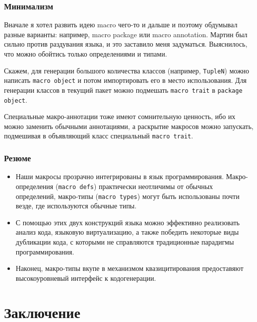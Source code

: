 \documentclass{beamer}
\begin{document}
\begin{frame}[t]
\frametitle{Минимализм}

Вначале я хотел развить идею macro чего-то и дальше и поэтому обдумывал разные варианты: например, macro package или macro annotation. Мартин был сильно против раздувания языка, и это заставило меня задуматься. Выяснилось, что можно обойтись только определениями и типами.

Скажем, для генерации большого количества классов (например, \texttt{TupleN}) можно написать \texttt{macro object} и потом импортировать его в место использования. Для генерации классов в текущий пакет можно подмешать \texttt{macro trait} в \texttt{package object}.

Специальные макро-аннотации тоже имеют сомнительную ценность, ибо их можно заменить обычными аннотациями, а раскрытие макросов можно запускать, подмешивая в объявляющий класс специальный \texttt{macro trait}.
\end{frame}

\begin{frame}[t]
\frametitle{Резюме}
\begin{itemize}
\item Наши макросы прозрачно интегрированы в язык программирования. Макро-определения (\texttt{macro defs}) практически неотличимы от обычных определений, макро-типы (\texttt{macro types}) могут быть использованы почти везде, где используются обычные типы.
\item С помощью этих двух конструкций языка можно эффективно реализовать анализ кода, языковую виртуализацию, а также победить некоторые виды дубликации кода, с которыми не справляются традиционные парадигмы программирования.
\item Наконец, макро-типы вкупе в механизмом квазицитирования предоставяют высокоуровневый интерфейс к кодогенерации.
\end{itemize}
\end{frame}

\section{Заключение}
\end{document}
